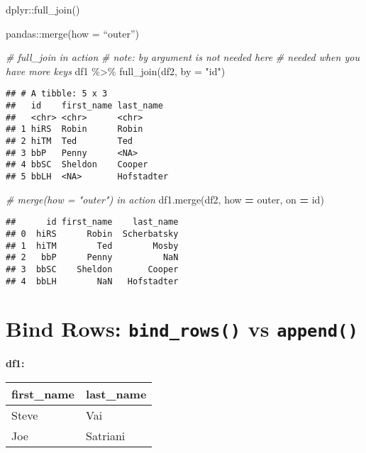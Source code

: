 \documentclass[
]{book}
\newenvironment{Shaded}{\begin{snugshade}}{\end{snugshade}}
\newcommand{\AttributeTok}[1]{\textcolor[rgb]{0.77,0.63,0.00}{#1}}
\newcommand{\CommentTok}[1]{\textcolor[rgb]{0.56,0.35,0.01}{\textit{#1}}}
\newcommand{\FunctionTok}[1]{\textcolor[rgb]{0.00,0.00,0.00}{#1}}
\newcommand{\NormalTok}[1]{#1}
\newcommand{\OperatorTok}[1]{\textcolor[rgb]{0.81,0.36,0.00}{\textbf{#1}}}
\newcommand{\SpecialCharTok}[1]{\textcolor[rgb]{0.00,0.00,0.00}{#1}}
\newcommand{\StringTok}[1]{\textcolor[rgb]{0.31,0.60,0.02}{#1}}
\begin{document}
dplyr::full\_join()

pandas::merge(how = ``outer'')

\begin{Shaded}
\begin{Highlighting}[]
\CommentTok{\# full\_join in action}
\CommentTok{\# note: by argument is not needed here}
\CommentTok{\# needed when you have more keys}
\NormalTok{df1 }\SpecialCharTok{\%\textgreater{}\%} \FunctionTok{full\_join}\NormalTok{(df2, }\AttributeTok{by =} \StringTok{"id"}\NormalTok{)}
\end{Highlighting}
\end{Shaded}

\begin{verbatim}
## # A tibble: 5 x 3
##   id    first_name last_name 
##   <chr> <chr>      <chr>     
## 1 hiRS  Robin      Robin     
## 2 hiTM  Ted        Ted       
## 3 bbP   Penny      <NA>      
## 4 bbSC  Sheldon    Cooper    
## 5 bbLH  <NA>       Hofstadter
\end{verbatim}

\begin{Shaded}
\begin{Highlighting}[]
\CommentTok{\# merge(how = "outer") in action}
\NormalTok{df1.merge(df2, how }\OperatorTok{=} \StringTok{\textquotesingle{}outer\textquotesingle{}}\NormalTok{, on }\OperatorTok{=} \StringTok{\textquotesingle{}id\textquotesingle{}}\NormalTok{)}
\end{Highlighting}
\end{Shaded}

\begin{verbatim}
##      id first_name    last_name
## 0  hiRS      Robin  Scherbatsky
## 1  hiTM        Ted        Mosby
## 2   bbP      Penny          NaN
## 3  bbSC    Sheldon       Cooper
## 4  bbLH        NaN   Hofstadter
\end{verbatim}

\hypertarget{bind-rows-bind_rows-vs-append}{%
\section{\texorpdfstring{Bind Rows: \texttt{bind\_rows()} vs \texttt{append()}}{Bind Rows: bind\_rows() vs append()}}\label{bind-rows-bind_rows-vs-append}}

\textbf{df1:}

\begin{longtable}[]{@{}ll@{}}
\toprule
first\_name & last\_name \\
\midrule
\endhead
Steve & Vai \\
Joe & Satriani \\
\bottomrule
\end{longtable}
\end{document}
